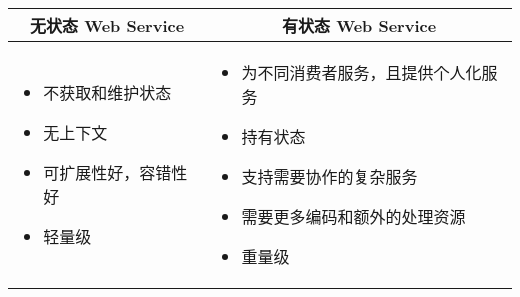 \begin{longtable}{|m{5cm}|m{7cm}|}
    \hline
    \multicolumn{1}{|c|}{\textbf{无状态 Web Service}} & \multicolumn{1}{c|}{\textbf{有状态 Web Service}} \\ \hline
    \vspace{-1.3em}
    \begin{itemize}[leftmargin=1.5em,itemsep=-3pt]
        \item 不获取和维护状态
        \item 无上下文
        \item 可扩展性好，容错性好
        \item 轻量级
    \vspace{-1.5em}
    \end{itemize}                                           
    & 
    \vspace{-1.3em}
    \begin{itemize}[leftmargin=1.5em,itemsep=-3pt]
        \item 为不同消费者服务，且提供个人化服务
        \item 持有状态
        \item 支持需要协作的复杂服务
        \item 需要更多编码和额外的处理资源
        \item 重量级
    \vspace{-1.5em}
    \end{itemize}  
    \\ \hline
\end{longtable}